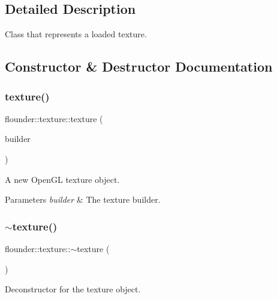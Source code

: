\subsection{Detailed Description}
Class that represents a loaded texture. 



\subsection{Constructor \& Destructor Documentation}
\mbox{\label{classflounder_1_1texture_a82dd2e895abe671411ab0fcaaf49b5d1}} 
\subsubsection{\texorpdfstring{texture()}{texture()}}
{\footnotesize\ttfamily flounder\+::texture\+::texture (\begin{DoxyParamCaption}\item[{\hyperlink{classflounder_1_1texture_1_1builder}{builder} $\ast$}]{builder }\end{DoxyParamCaption})\hspace{0.3cm}{\ttfamily [protected]}}



A new Open\+GL texture object. 


\begin{DoxyParams}{Parameters}
{\em builder} & The texture builder. \\
\hline
\end{DoxyParams}
\mbox{\label{classflounder_1_1texture_a8271c7f9860a5a235be9b1207bed2c39}} 
\subsubsection{\texorpdfstring{$\sim$texture()}{~texture()}}
{\footnotesize\ttfamily flounder\+::texture\+::$\sim$texture (\begin{DoxyParamCaption}{ }\end{DoxyParamCaption})}



Deconstructor for the texture object. 



